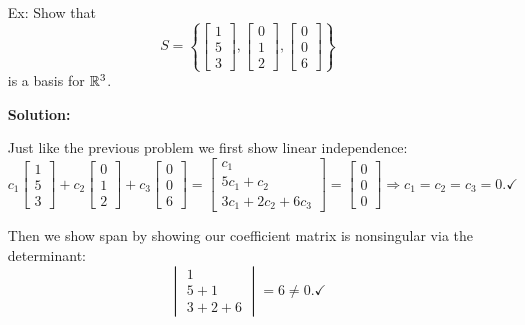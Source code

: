 \documentclass[reqno]{amsart}
\theoremstyle{definition}
\begin{document}
\begin{enumerate}
\item[Ex:  ]  Show that
%
\begin{equation*}
S = \left\lbrace\begin{bmatrix}
1\\
5\\
3
\end{bmatrix}, \begin{bmatrix}
0\\
1\\
2
\end{bmatrix}, \begin{bmatrix}
0\\
0\\
6
\end{bmatrix}\right\rbrace
\end{equation*}
%
is a basis for $\mathbb{R}^3$.

\textbf{Solution:  }

Just like the previous problem we first show linear independence:
%
\begin{equation*}
c_1\begin{bmatrix}
1\\
5\\
3
\end{bmatrix} + c_2\begin{bmatrix}
0\\
1\\
2
\end{bmatrix} + c_3\begin{bmatrix}
0\\
0\\
6
\end{bmatrix} = \begin{bmatrix}
c_1\\
5c_1 + c_2\\
3c_1 + 2c_2 + 6c_3
\end{bmatrix} = \begin{bmatrix}
0\\
0\\
0
\end{bmatrix} \Rightarrow c_1 = c_2 = c_3 = 0. \checkmark
\end{equation*}

Then we show span by showing our coefficient matrix is nonsingular via the determinant:
%
\begin{equation*}
\begin{vmatrix}
1\\
5 + 1\\
3 + 2 + 6
\end{vmatrix} = 6 \neq 0. \checkmark
\end{equation*}

\end{enumerate}
\end{document}
